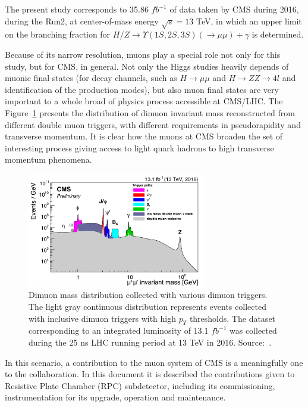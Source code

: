 The present study corresponds to 35.86 $fb^{-1}$ of data taken by CMS during 2016, during the Run2, at center-of-mass energy $\sqrt{s} = 13$ TeV, in which an upper limit on the branching fraction for $H/Z \rightarrow \Upsilon(1S, 2S, 3S) (\rightarrow \mu\mu) + \gamma $ is determined.

Because of its narrow resolution, muons play a special role not only for this study, but for CMS, in general. Not only the Higgs studies heavily depends of muonic final states (for decay channels, such as $H \rightarrow \mu\mu$ and $H \rightarrow ZZ \rightarrow 4l$ and identification of the production modes), but also muon final states are very important to a whole broad of physics process accessible at CMS/LHC. The Figure~\ref{dimuon_invariant_mass} presents the distribution of dimuon invariant mass reconstructed from different double muon triggers, with different requirements in pseudorapidity and transverse momentum. It is clear how the muons at CMS broaden the set of interesting process giving access to light quark hadrons to high transverse momentum phenomena.

\begin{figure}[htbp]
    \centering
    \includegraphics[width=0.7\textwidth]{figures_and_tables/introduction/dimuon_inv_mass.pdf}
    \caption{Dimuon mass distribution collected with various dimuon triggers. The light gray continuous distribution represents events collected with inclusive dimuon triggers with high $p_T$ thresholds. The dataset corresponding to an integrated luminosity of 13.1 $fb^{-1}$ was collected during the 25 ns LHC  running period at 13 TeV in 2016. Source:~\cite{dimuon_inv_mass}.}
    \label{dimuon_invariant_mass}
\end{figure}

In this scenario, a contribution to the muon system of CMS is a meaningfully one to the collaboration. In this document it is described the contributions given to Resistive Plate Chamber (RPC) subdetector, including its commissioning, instrumentation for its upgrade, operation and maintenance.

